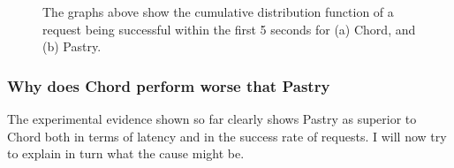 \begin{figure}[htb]
  \centering
  \caption{The graphs above show the cumulative distribution function of a request being successful within the first 5 seconds for (a) Chord, and (b) Pastry.}
\end{figure}

\subsubsection{Why does Chord perform worse that Pastry}
The experimental evidence shown so far clearly shows Pastry as superior to Chord both in terms of latency and in the success rate of requests. I will now try to explain in turn what the cause might be.

